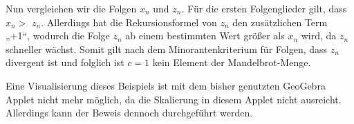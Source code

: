 \documentclass[a4paper, 12pt]{book}
\begin{document}
Nun vergleichen wir die Folgen \(x_{n}\) und \(z_{n}\). Für die ersten
Folgenglieder gilt, dass \(x_{n} > \) \(z_{n}\). Allerdings hat die
Rekursionsformel von \(z_{n}\) den zusätzlichen Term „+1``, wodurch die
Folge \(z_{n}\) ab einem bestimmten Wert größer als \(x_{n}\) wird, da
\(z_{n}\) schneller wächst. Somit gilt nach dem Minorantenkriterium für
Folgen, dass \(z_{n}\) divergent ist und folglich ist \(c = 1\) kein
Element der Mandelbrot-Menge. \hfill\blacksquare

Eine Visualisierung dieses Beispiels ist mit dem bisher genutzten
GeoGebra Applet nicht mehr möglich, da die Skalierung in diesem Applet
nicht ausreicht. Allerdings kann der Beweis dennoch durchgeführt werden.


\nocite{*}

\end{document}
